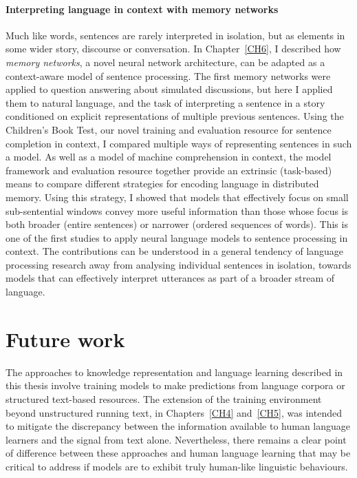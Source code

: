\paragraph{Interpreting language in context with memory networks} Much like words, sentences are rarely interpreted in isolation, but as elements in some wider story, discourse or conversation. In Chapter~\ref{CH6}, I described how \emph{memory networks}, a novel neural network architecture, can be adapted as a context-aware model of sentence processing. The first memory networks were applied to question answering about simulated discussions, but here I applied them to natural language, and the task of interpreting a sentence in a story conditioned on explicit representations of multiple previous sentences. Using the Children's Book Test, our novel training and evaluation resource for sentence completion in context, I compared multiple ways of representing sentences in such a model. As well as a model of machine comprehension in context, the model framework and evaluation resource together provide an extrinsic (task-based) means to compare different strategies for encoding language in distributed memory. Using this strategy, I showed that models that effectively focus on small sub-sentential windows convey more useful information than those whose focus is both broader (entire sentences) or narrower (ordered sequences of words). This is one of the first studies to apply neural language models to sentence processing in context. The contributions can be understood in a general tendency of language processing research away from analysing individual sentences in isolation, towards models that can effectively interpret utterances as part of a broader stream of language.  

\section{Future work} The approaches to knowledge representation and language learning described in this thesis involve training models to make predictions from language corpora or structured text-based resources. The extension of the training environment beyond unstructured running text, in Chapters~\ref{CH4} and~\ref{CH5}, was intended to mitigate the discrepancy between the information available to human language learners and the signal from text alone. Nevertheless, there remains a clear point of difference between these approaches and human language learning that may be critical to address if models are to exhibit truly human-like linguistic behaviours. 

